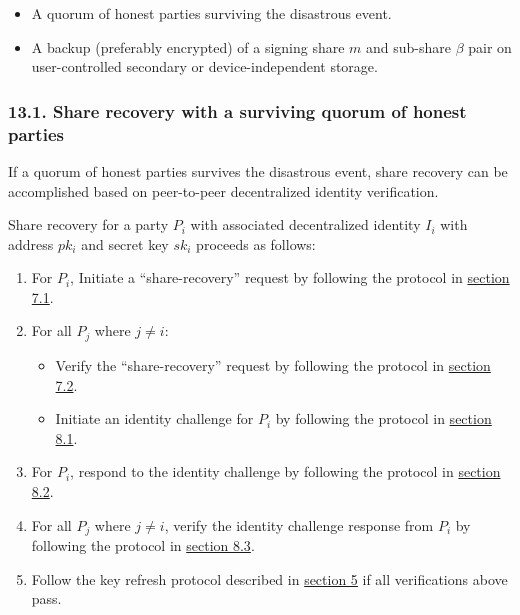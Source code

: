 \documentclass[
]{article}
\providecommand{\tightlist}{%
  \setlength{\itemsep}{0pt}\setlength{\parskip}{0pt}}
\begin{document}
\begin{itemize}
\tightlist
\item
  A quorum of honest parties surviving the disastrous event.
\item
  A backup (preferably encrypted) of a signing share \(m\) and sub-share
  \(\beta\) pair on user-controlled secondary or device-independent
  storage.
\end{itemize}

\hypertarget{share-recovery-quorum}{%
\subsubsection{13.1. Share recovery with a surviving quorum of honest
parties}\label{share-recovery-quorum}}

If a quorum of honest parties survives the disastrous event, share
recovery can be accomplished based on peer-to-peer decentralized
identity verification.

Share recovery for a party \(P_i\) with associated decentralized
identity \(I_i\) with address \(pk_i\) and secret key \(sk_i\) proceeds
as follows:

\begin{enumerate}
\def\labelenumi{\arabic{enumi}.}
\tightlist
\item
  For \(P_i\), Initiate a ``share-recovery'' request by following the
  protocol in
  \protect\hyperlink{identity-authed-request-initiation}{section 7.1}.
\item
  For all \(P_j\) where \(j \neq i\):

  \begin{itemize}
  \tightlist
  \item
    Verify the ``share-recovery'' request by following the protocol in
    \protect\hyperlink{identity-authed-request-verification}{section
    7.2}.
  \item
    Initiate an identity challenge for \(P_i\) by following the protocol
    in \protect\hyperlink{identity-challenge-initiation}{section 8.1}.
  \end{itemize}
\item
  For \(P_i\), respond to the identity challenge by following the
  protocol in \protect\hyperlink{identity-challenge-response}{section
  8.2}.
\item
  For all \(P_j\) where \(j \neq i\), verify the identity challenge
  response from \(P_i\) by following the protocol in
  \protect\hyperlink{identity-challenge-verification}{section 8.3}.
\item
  Follow the key refresh protocol described in
  \protect\hyperlink{key-refresh}{section 5} if all verifications above
  pass.
\end{enumerate}
\end{document}
